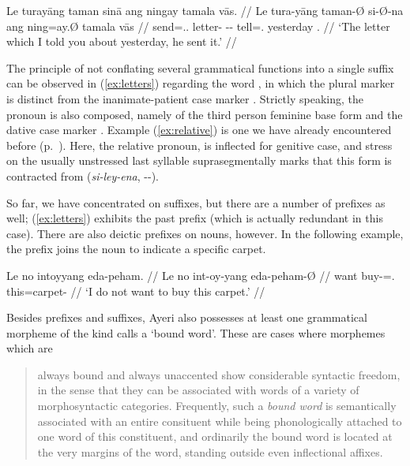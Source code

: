 \a\label{ex:relative}\begingl
	\gla Le turayāng taman sinā ang ningay tamala vās. //
	\glb Le tura-yāng taman-Ø si-Ø-na ang ning=ay.Ø tamala vās //
	\glc \PatTI{} send=\Tsg{}.\M{}.\Aarg{} letter-\Top{} 
		\Rel{}-\PatTI{}-\Gen{} \AgtT{} tell=\Fsg{}.\Top{} yesterday 
		\Ssg{}.\Parg{} //
	\glft `The letter which I told you about yesterday, he sent it.' //
\endgl
\xe

The principle of not conflating several grammatical functions into a single 
suffix can be observed in (\ref{ex:letters}) regarding the word 
, in which the plural marker 
 is distinct from the inanimate-patient case marker 
. Strictly speaking, the pronoun  
is also composed, namely of the third person feminine base form  
and the dative case marker . Example (\ref{ex:relative}) is one 
we have already encountered before (p.~\pageref{doublerel}). Here, the relative 
pronoun,  is inflected for genitive case, and 
stress on the usually unstressed last syllable 
suprasegmentally marks that this form is contracted from 
 (\textit{si-ley-ena}, \Rel{}-\PargI{}-\Gen{}).

So far, we have concentrated on suffixes, but there are a number of 
prefixes as well; (\ref{ex:letters}) exhibits the past prefix 
 (which is actually redundant in this case). There are also 
deictic prefixes on nouns, however. In the following example, the prefix 
 joins the noun  to indicate a 
specific carpet.

\ex\begingl
	\gla Le no intoyyang eda-peham. //
	\glb Le no int-oy-yang eda-peham-Ø //
	\glc \PatTI{} want buy-\Neg{}=\Fsg{}.\Aarg{} this=carpet-\Top{} //
	\glft `I do not want to buy this carpet.' //
\endgl\xe

Besides prefixes and suffixes, Ayeri also possesses at least one grammatical 
morpheme of the kind \citet{zwicky1977} calls a `bound word'. These are cases where morphemes which are

\blockcquote[6]{zwicky1977}{always bound and always unaccented show 
considerable syntactic freedom, in the sense that they can be associated with 
words of a variety of morphosyntactic categories. Frequently, such a \emph{bound 
word} is semantically associated with an entire consituent while being 
phonologically attached to one word of this constituent, and ordinarily the 
bound word is located at the very margins of the word, standing outside even 
inflectional affixes.}

